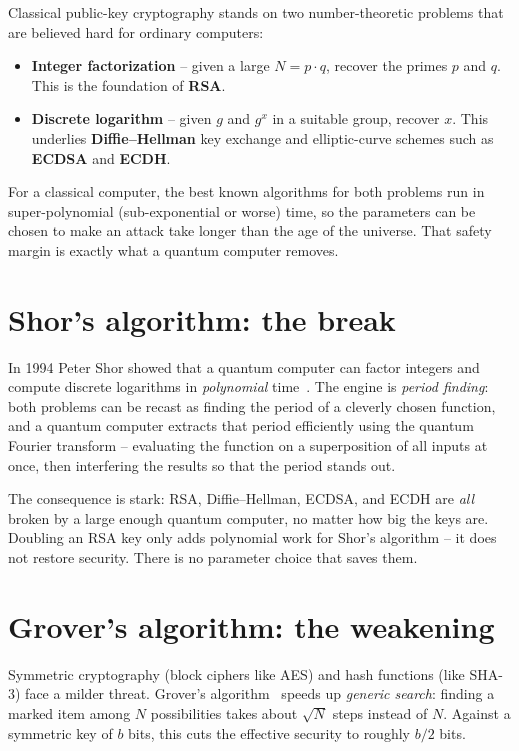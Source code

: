 Classical public-key cryptography stands on two number-theoretic problems that are believed hard for ordinary computers:

\begin{itemize}
  \item \textbf{Integer factorization} -- given a large $N = p\cdot q$, recover the primes $p$ and $q$. This is the foundation of \textbf{RSA}.
  \item \textbf{Discrete logarithm} -- given $g$ and $g^x$ in a suitable group, recover $x$. This underlies \textbf{Diffie--Hellman} key exchange and elliptic-curve schemes such as \textbf{ECDSA} and \textbf{ECDH}.
\end{itemize}

For a classical computer, the best known algorithms for both problems run in super-polynomial (sub-exponential or worse) time, so the parameters can be chosen to make an attack take longer than the age of the universe. That safety margin is exactly what a quantum computer removes.

\section{Shor's algorithm: the break}

In 1994 Peter Shor showed that a quantum computer can factor integers and compute discrete logarithms in \emph{polynomial} time~\cite{shor1997}. The engine is \emph{period finding}: both problems can be recast as finding the period of a cleverly chosen function, and a quantum computer extracts that period efficiently using the quantum Fourier transform -- evaluating the function on a superposition of all inputs at once, then interfering the results so that the period stands out.

The consequence is stark: RSA, Diffie--Hellman, ECDSA, and ECDH are \emph{all} broken by a large enough quantum computer, no matter how big the keys are. Doubling an RSA key only adds polynomial work for Shor's algorithm -- it does not restore security. There is no parameter choice that saves them.

\section{Grover's algorithm: the weakening}

Symmetric cryptography (block ciphers like AES) and hash functions (like SHA-3) face a milder threat. Grover's algorithm~\cite{grover1996} speeds up \emph{generic search}: finding a marked item among $N$ possibilities takes about $\sqrt{N}$ steps instead of $N$. Against a symmetric key of $b$ bits, this cuts the effective security to roughly $b/2$ bits.


